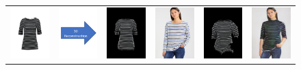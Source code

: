 

\begin{figure}[t]
   \centering
\begin{tabular}{lccccc}

\includegraphics[width=2cm]{figures/c2dw/000008_1.png}&
\includegraphics[width=2cm]{figures/arrow_recon.png}&
\includegraphics[width=2cm]{figures/c3drecon/000008_1_000303_0.png}&
\includegraphics[width=2cm]{figures/image/000303_0.jpg}&
\includegraphics[width=2cm]{figures/c3dwfull/000008_1_000303_0.png}&
\includegraphics[width=2cm]{figures/try-on/000008_1_000303_0.jpg}\\


\end{tabular}
\end{figure}
